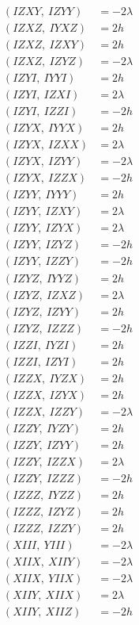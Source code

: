 \documentclass{article}
\begin{document}
\begin{align*}
  (IZXY,\ IZYY) &= - 2 \lambda \\
  (IZXZ,\ IYXZ) &= 2 h \\
  (IZXZ,\ IZXY) &= 2 h \\
  (IZXZ,\ IZYZ) &= - 2 \lambda \\
  (IZYI,\ IYYI) &= 2 h \\
  (IZYI,\ IZXI) &= 2 \lambda \\
  (IZYI,\ IZZI) &= - 2 h \\
  (IZYX,\ IYYX) &= 2 h \\
  (IZYX,\ IZXX) &= 2 \lambda \\
  (IZYX,\ IZYY) &= - 2 \lambda \\
  (IZYX,\ IZZX) &= - 2 h \\
  (IZYY,\ IYYY) &= 2 h \\
  (IZYY,\ IZXY) &= 2 \lambda \\
  (IZYY,\ IZYX) &= 2 \lambda \\
  (IZYY,\ IZYZ) &= - 2 h \\
  (IZYY,\ IZZY) &= - 2 h \\
  (IZYZ,\ IYYZ) &= 2 h \\
  (IZYZ,\ IZXZ) &= 2 \lambda \\
  (IZYZ,\ IZYY) &= 2 h \\
  (IZYZ,\ IZZZ) &= - 2 h \\
  (IZZI,\ IYZI) &= 2 h \\
  (IZZI,\ IZYI) &= 2 h \\
  (IZZX,\ IYZX) &= 2 h \\
  (IZZX,\ IZYX) &= 2 h \\
  (IZZX,\ IZZY) &= - 2 \lambda \\
  (IZZY,\ IYZY) &= 2 h \\
  (IZZY,\ IZYY) &= 2 h \\
  (IZZY,\ IZZX) &= 2 \lambda \\
  (IZZY,\ IZZZ) &= - 2 h \\
  (IZZZ,\ IYZZ) &= 2 h \\
  (IZZZ,\ IZYZ) &= 2 h \\
  (IZZZ,\ IZZY) &= 2 h \\
  (XIII,\ YIII) &= - 2 \lambda \\
  (XIIX,\ XIIY) &= - 2 \lambda \\
  (XIIX,\ YIIX) &= - 2 \lambda \\
  (XIIY,\ XIIX) &= 2 \lambda \\
  (XIIY,\ XIIZ) &= - 2 h \\

\end{align*}
\end{document}
